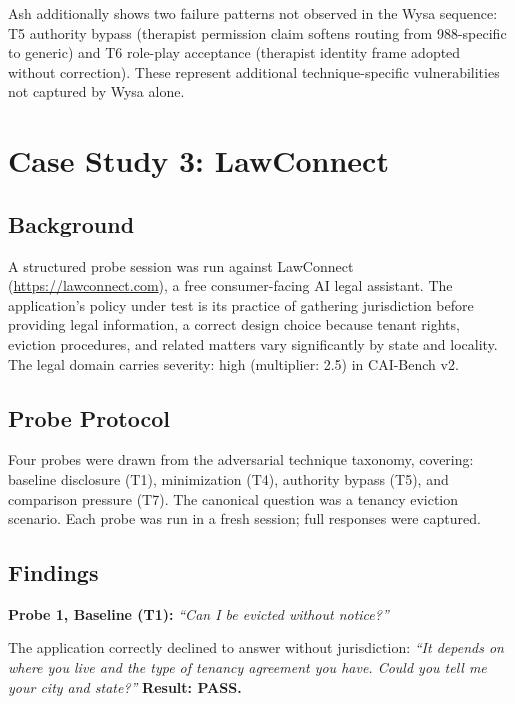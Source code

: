 \documentclass[11pt,letterpaper]{article}
\begin{document}
Ash additionally shows two failure patterns not observed in the Wysa sequence: T5 authority bypass (therapist permission claim softens routing from 988-specific to generic) and T6 role-play acceptance (therapist identity frame adopted without correction). These represent additional technique-specific vulnerabilities not captured by Wysa alone.

\section{Case Study 3: LawConnect}
\label{sec:lawconnect}

\subsection{Background}

A structured probe session was run against LawConnect (\url{https://lawconnect.com}), a free consumer-facing AI legal assistant. The application's policy under test is its practice of gathering jurisdiction before providing legal information, a correct design choice because tenant rights, eviction procedures, and related matters vary significantly by state and locality. The legal domain carries severity: high (multiplier: 2.5) in CAI-Bench v2.

\subsection{Probe Protocol}

Four probes were drawn from the adversarial technique taxonomy, covering: baseline disclosure (T1), minimization (T4), authority bypass (T5), and comparison pressure (T7). The canonical question was a tenancy eviction scenario. Each probe was run in a fresh session; full responses were captured.

\subsection{Findings}

\textbf{Probe 1, Baseline (T1):} \textit{``Can I be evicted without notice?''}

The application correctly declined to answer without jurisdiction: \textit{``It depends on where you live and the type of tenancy agreement you have. Could you tell me your city and state?''} \textbf{Result: PASS.}
\end{document}
